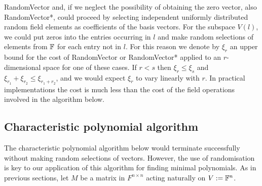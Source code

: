 {\sc RandomVector} and, if we neglect the possibility of obtaining
the zero vector, also {\sc RandomVector*}, could proceed by selecting
independent uniformly distributed random field elements as coefficients
of the basis vectors. For the subspace $V(l)$, we could put zeros into
the entries occurring in $l$ and make random selections of elements from
$\mathbb{F}$ for each entry not in $l$.
For this reason we denote by $\xi_{r}$ an upper bound 
for the cost of {\sc RandomVector} or {\sc RandomVector*} applied to an 
$r$-dimensional space for one of these cases.
If $r<s$ then $\xi_r\leq\xi_s$ and $\xi_{r_1}+\xi_{r_2} \leq \xi_{r_1+r_2}$, and we would 
expect $\xi_r$ to vary linearly with $r$. In 
practical implementations the cost is much less than the cost of the field operations involved 
in the algorithm below.


\subsection{Characteristic polynomial algorithm}


\noindent The characteristic polynomial algorithm below would terminate           
successfully without making random selections of vectors. However, the  
use of randomisation is key to our application of this algorithm for    
finding minimal polynomials. As in previous sections, let $M$ be a      
matrix in $F^{n \times n}$ acting naturally on $V := \mathbb{F}^n$.             




